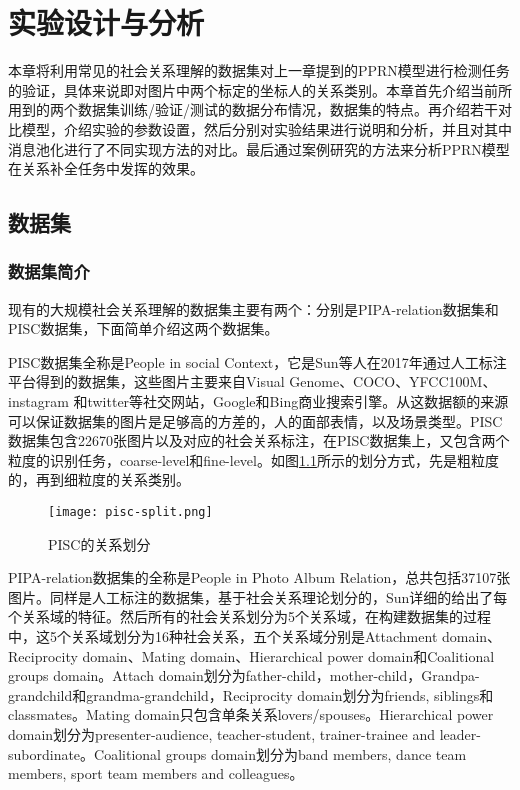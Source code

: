 
\chapter{实验设计与分析}
\label{ch:exp}

本章将利用常见的社会关系理解的数据集对上一章提到的PPRN模型进行检测任务的验证，具体来说即对图片中两个标定的坐标人的关系类别。本章首先介绍当前所用到的两个数据集训练/验证/测试的数据分布情况，数据集的特点。再介绍若干对比模型，介绍实验的参数设置，然后分别对实验结果进行说明和分析，并且对其中消息池化进行了不同实现方法的对比。最后通过案例研究的方法来分析PPRN模型在关系补全任务中发挥的效果。

\section{数据集}

\subsection{数据集简介}

现有的大规模社会关系理解的数据集主要有两个：分别是PIPA-relation\cite{sun2017a}数据集和PISC\cite{li2017dual-glance}数据集，下面简单介绍这两个数据集。

PISC数据集全称是People in social Context，它是Sun等人在2017年通过人工标注平台得到的数据集，这些图片主要来自Visual Genome\cite{krishna2017visual}、COCO\cite{lin2014microsoft}、YFCC100M\cite{thomee2016yfcc100m}、instagram 和twitter等社交网站，Google和Bing商业搜索引擎。从这数据额的来源可以保证数据集的图片是足够高的方差的，人的面部表情，以及场景类型。PISC数据集包含22670张图片以及对应的社会关系标注，在PISC数据集上，又包含两个粒度的识别任务，coarse-level和fine-level。如图\ref{fig:exp-pisc-r}所示的划分方式，先是粗粒度的，再到细粒度的关系类别。
\begin{figure}[htpb]
	\centering
	\texttt{[image: pisc-split.png]}
    \caption{PISC的关系划分}
	\vspace*{-3.5mm}
	\label{fig:exp-pisc-r}
\end{figure}

PIPA-relation数据集的全称是People in Photo Album Relation，总共包括37107张图片。同样是人工标注的数据集，基于社会关系理论\cite{bugental2000acquisition}划分的，Sun\cite{sun2017a}详细的给出了每个关系域的特征。然后所有的社会关系划分为5个关系域，在构建数据集的过程中，这5个关系域划分为16种社会关系，五个关系域分别是Attachment domain、Reciprocity domain、Mating domain、Hierarchical power domain和Coalitional groups domain。Attach domain划分为father-child，mother-child，Grandpa-grandchild和grandma-grandchild，Reciprocity domain划分为friends, siblings和classmates。Mating domain只包含单条关系lovers/spouses。Hierarchical power domain划分为presenter-audience, teacher-student, trainer-trainee and leader-subordinate。Coalitional groups domain划分为band members, dance team members, sport team members and colleagues。

